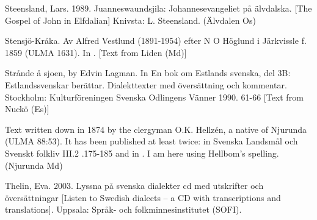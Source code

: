 \begin{listWWNumileveli}
\begin{styleSource}
\end{styleSource}

\item 

\begin{styleSource}
\label{bkm:Ref150065761}Steensland, Lars. 1989. Juanneswaundsjila: Johannesevangeliet på älvdalska. [The Gospel of John in Elfdalian] Knivsta: L. Steensland. (Älvdalen Os)

\end{styleSource}

\item 

\begin{styleSource}
\label{bkm:Ref154221412}Stensjö-Kråka. Av Alfred Vestlund (1891-1954) efter N O Höglund i Järkvissle f. 1859 (ULMA 1631). In \citet[17-19]{Hellbom1980}. [Text from Liden (Md)]

\end{styleSource}

\item 

\begin{styleSource}
\label{bkm:Ref223343666}Strånde å sjoen, by Edvin Lagman. In En bok om Estlands svenska, del 3B: Estlandssvenskar berättar. Dialekttexter med översättning och kommentar. Stockholm: Kulturföreningen Svenska Odlingens Vänner 1990.  61-66 [Text from Nuckö (Es)]

\end{styleSource}

\item 

\begin{styleSource}
\label{bkm:Ref154302630}Text written down in 1874 by the clergyman O.K. Hellzén, a native of Njurunda (ULMA 88:53). It has been published at least twice: in Svenska Landsmål och Svenskt folkliv III.2 .175-185 and in \citet[92-107]{Hellbom1980}. I am here using Hellbom’s spelling. (Njurunda Md)

\end{styleSource}

\item 

\begin{styleSource}
Thelin, Eva. 2003. Lyssna på svenska dialekter cd med utskrifter och översättningar [Listen to Swedish dialects – a CD with transcriptions and translations]. Uppsala: Språk- och folkminnesinstitutet (SOFI).

\end{styleSource}


\end{listWWNumileveli}
